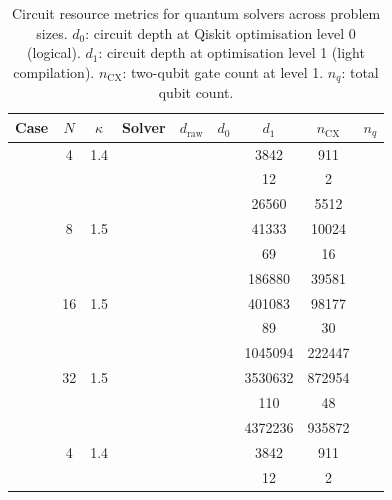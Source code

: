 \begin{table}[htbp]
  \centering
  \caption{Circuit resource metrics for quantum solvers across problem sizes. $d_0$: circuit depth at Qiskit optimisation level 0 (logical). $d_1$: circuit depth at optimisation level 1 (light compilation). $n_\mathrm{CX}$: two-qubit gate count at level 1. $n_q$: total qubit count.}
  \label{tab:circuit_resources}
  \begin{tabular}{l S[table-format=3.0] S[table-format=4.1] l S[table-format=6.0] S[table-format=6.0] S[table-format=6.0] S[table-format=5.0] S[table-format=2.0]}
    \toprule
    {Case} & {$N$} & {$\kappa$} & {Solver} & {$d_\mathrm{raw}$} & {$d_0$} & {$d_1$} & {$n_\mathrm{CX}$} & {$n_q$} \\
    \midrule
     & 4 & 1.4 &  & {\text{---}} & {\text{---}} & 3842 & 911 & {\text{---}} \\
     &  &  &  & {\text{---}} & {\text{---}} & 12 & 2 & {\text{---}} \\
     &  &  &  & {\text{---}} & {\text{---}} & 26560 & 5512 & {\text{---}} \\
     & 8 & 1.5 &  & {\text{---}} & {\text{---}} & 41333 & 10024 & {\text{---}} \\
     &  &  &  & {\text{---}} & {\text{---}} & 69 & 16 & {\text{---}} \\
     &  &  &  & {\text{---}} & {\text{---}} & 186880 & 39581 & {\text{---}} \\
     & 16 & 1.5 &  & {\text{---}} & {\text{---}} & 401083 & 98177 & {\text{---}} \\
     &  &  &  & {\text{---}} & {\text{---}} & 89 & 30 & {\text{---}} \\
     &  &  &  & {\text{---}} & {\text{---}} & 1045094 & 222447 & {\text{---}} \\
     & 32 & 1.5 &  & {\text{---}} & {\text{---}} & 3530632 & 872954 & {\text{---}} \\
     &  &  &  & {\text{---}} & {\text{---}} & 110 & 48 & {\text{---}} \\
     &  &  &  & {\text{---}} & {\text{---}} & 4372236 & 935872 & {\text{---}} \\
    \midrule
     & 4 & 1.4 &  & {\text{---}} & {\text{---}} & 3842 & 911 & {\text{---}} \\
     &  &  &  & {\text{---}} & {\text{---}} & 12 & 2 & {\text{---}} \\

\end{tabular}
\end{table}
